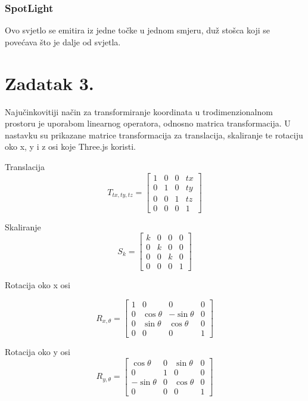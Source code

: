 \documentclass[a4paper,12pt]{article}
\begin{document}
\subsubsection{SpotLight}
\hspace{10mm} Ovo svjetlo se emitira iz jedne točke u jednom smjeru, duž stošca koji se povećava što je dalje od svjetla.

\pagebreak


\section{Zadatak 3.}
Najučinkovitiji način za transformiranje koordinata u trodimenzionalnom prostoru je uporabom
linearnog operatora, odnosno matrica transformacija. U nastavku su prikazane matrice transformacija
za translacija, skaliranje te rotaciju oko x, y i z osi koje Three.js koristi.

Translacija
\[
T_{tx,ty,tz}=
\begin{bmatrix}
    1 & 0 & 0 & tx \\
    0 & 1 & 0 & ty \\
    0 & 0 & 1 & tz \\
    0 & 0 & 0 & 1
\end{bmatrix}
\]

Skaliranje
\[
S_{k}=
\begin{bmatrix}
    k & 0 & 0 & 0 \\
    0 & k & 0 & 0 \\
    0 & 0 & k & 0 \\
    0 & 0 & 0 & 1
\end{bmatrix}
\]

Rotacija oko x osi

\[
R_{x,\theta}=
\begin{bmatrix}
    1 & 0 & 0 & 0 \\
    0 & \cos{\theta} & -\sin{\theta} & 0 \\
    0 & \sin{\theta} & \cos{\theta} & 0 \\
    0 & 0 & 0 & 1
\end{bmatrix}
\]

Rotacija oko y osi
\[
R_{y,\theta}=
\begin{bmatrix}
    \cos{\theta} & 0 & \sin{\theta} & 0 \\
    0 & 1 & 0 & 0 \\
    -\sin{\theta} & 0 & \cos{\theta} & 0 \\
    0 & 0 & 0 & 1
\end{bmatrix}
\]
\end{document}
